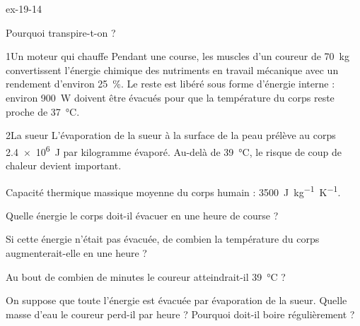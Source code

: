 \begin{blocLivre}{ex-19-14}
\begin{exercice}[3]{Pourquoi transpire-t-on ?}
\begin{docu}{1}{Un moteur qui chauffe}
Pendant une course, les muscles d'un coureur de \qty{70}{kg} convertissent l'énergie chimique des nutriments en travail
mécanique avec un rendement d'environ 25~\%. Le reste est libéré sous forme d'énergie interne : environ \qty{900}{W} doivent
être évacués pour que la température du corps reste proche de \qty{37}{\degreeCelsius}.
\end{docu}
\begin{docu}{2}{La sueur}
L'évaporation de la sueur à la surface de la peau prélève au corps \qty{2,4e6}{J} par kilogramme évaporé. Au-delà de
\qty{39}{\degreeCelsius}, le risque de coup de chaleur devient important.
\end{docu}
\begin{donnees}
Capacité thermique massique moyenne du corps humain : \qty{3500}{J.kg^{-1}.K^{-1}}.
\end{donnees}
\begin{questions}
\item Quelle énergie le corps doit-il évacuer en une heure de course ?
\item Si cette énergie n'était pas évacuée, de combien la température du corps augmenterait-elle en une heure ?
\item \initiative Au bout de combien de minutes le coureur atteindrait-il \qty{39}{\degreeCelsius} ?
\item On suppose que toute l'énergie est évacuée par évaporation de la sueur. Quelle masse d'eau le coureur perd-il par
heure ? Pourquoi doit-il boire régulièrement ?
\end{questions}
\end{exercice}
\end{blocLivre}
